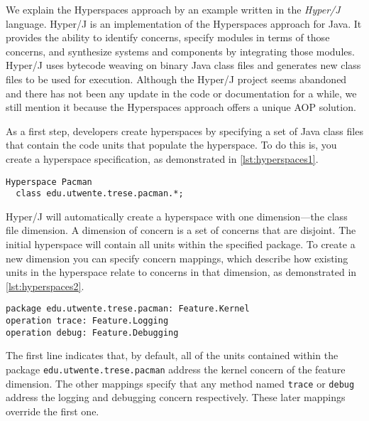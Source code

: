 We explain the Hyperspaces approach by an example written in the \emph{Hyper/J} language.
Hyper/J is an implementation of the Hyperspaces approach for Java.
It provides the ability to identify concerns, specify modules in terms of those concerns, and synthesize systems and components by integrating those modules.
Hyper/J uses bytecode weaving on binary Java class files and generates new class files to be used for execution.
Although the Hyper/J project seems abandoned and there has not been any update in the code or documentation for a while, we still mention it because the Hyperspaces approach offers a unique AOP solution.

As a first step, developers create hyperspaces by specifying a set of Java class files that contain the code units that populate the hyperspace.
To do this is, you create a hyperspace specification, as demonstrated in \autoref{lst:hyperspaces1}.

\begin{lstlisting}[language={[HyperJ]Java},style=floatlisting,%
                   caption={Creation of a hyperspace},label={lst:hyperspaces1},%
                   floatplacement=htbp]
Hyperspace Pacman
  class edu.utwente.trese.pacman.*;
\end{lstlisting}

Hyper/J will automatically create a hyperspace with one dimension---the class file dimension.
A dimension of concern is a set of concerns that are disjoint.
The initial hyperspace will contain all units within the specified package.
To create a new dimension you can specify concern mappings, which describe how existing units in the hyperspace relate to concerns in that dimension, as demonstrated in \autoref{lst:hyperspaces2}.

\begin{lstlisting}[language={[HyperJ]Java},style=floatlisting,%
                   caption={Specification of concern mappings},label={lst:hyperspaces2},%
                   floatplacement=htbp]
package edu.utwente.trese.pacman: Feature.Kernel
operation trace: Feature.Logging
operation debug: Feature.Debugging
\end{lstlisting}

The first line indicates that, by default, all of the units contained within the package \lstinline|edu.utwente.trese.pacman| address the kernel concern of the feature dimension.
The other mappings specify that any method named \lstinline|trace| or \lstinline|debug| address the logging and debugging concern respectively.
These later mappings override the first one.


